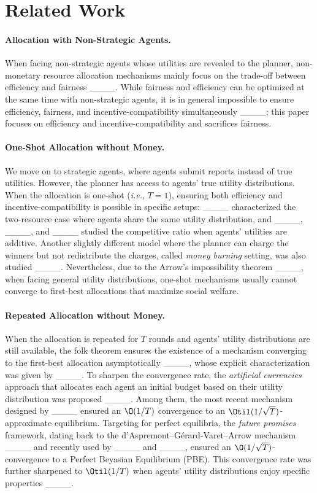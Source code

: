 \section{Related Work}
\label{sec:related work}
\paragraph{Allocation with Non-Strategic Agents.}
When facing non-strategic agents whose utilities are revealed to the planner, non-monetary resource allocation mechanisms mainly focus on the trade-off between efficiency and fairness ____.
While fairness and efficiency can be optimized at the same time with non-strategic agents, it is in general impossible to ensure efficiency, fairness, and incentive-compatibility simultaneously ____; this paper focuses on efficiency and incentive-compatibility and sacrifices fairness.

\paragraph{One-Shot Allocation without Money.}
We move on to strategic agents, where agents submit reports instead of true utilities. However, the planner has access to agents' true utility distributions.
When the allocation is one-shot (\textit{i.e.}, $T=1$), ensuring both efficiency and incentive-compatibility is possible in specific setups: ____ characterized the two-resource case where agents share the same utility distribution, and ____, ____, and ____ studied the competitive ratio when agents' utilities are additive. Another slightly different model where the planner can charge the winners but not redistribute the charges, called \textit{money burning} setting, was also studied ____. Nevertheless, due to the Arrow's impossibility theorem ____, when facing general utility distributions, one-shot mechanisms usually cannot converge to first-best allocations that maximize social welfare.

\paragraph{Repeated Allocation without Money.}
When the allocation is repeated for $T$ rounds and agents' utility distributions are still available, the folk theorem ensures the existence of a mechanism converging to the first-best allocation asymptotically ____, whose explicit characterization was given by ____. To sharpen the convergence rate, the \textit{artificial currencies} approach that allocates each agent an initial budget based on their utility distribution was proposed ____. Among them, the most recent mechanism designed by ____ ensured an $\O(1/T)$ convergence to an $\Otil(1/\sqrt T)$-approximate equilibrium. Targeting for perfect equilibria, the \textit{future promises} framework, dating back to the d'Aspremont--Gérard-Varet--Arrow mechanism ____ and recently used by ____ and ____, ensured an $\O(1/\sqrt T)$-convergence to a Perfect Beyasian Equilibrium (PBE). This convergence rate was further sharpened to $\Otil(1/T)$ when agents' utility distributions enjoy specific properties ____.

